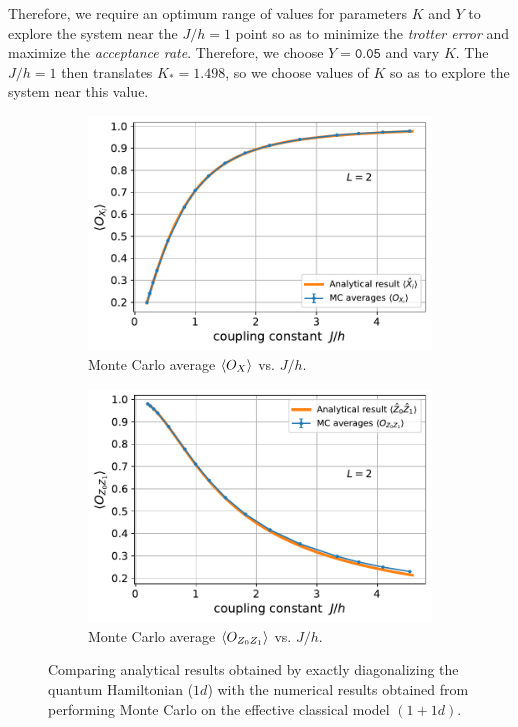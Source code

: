 \documentclass[../thesis_main.tex]{subfiles}
\begin{document}
Therefore, we require an optimum range of values for parameters $K$ and $Y$ to explore the system near the $J/h = 1$ point so as to minimize the \textit{trotter error} and maximize the \textit{acceptance rate}. Therefore, we choose $Y = \texttt{0.05}$ and vary $K$. The $J/h = 1$ then translates $K_* = 1.498$, so we choose values of $K$ so as to explore the system near this value.    
\begin{figure}[!htb]
    \centering
    \begin{subfigure}[b]{0.49\textwidth}
        \centering
        \includegraphics[width=\textwidth]{images/2_site/O_X.pdf}
        \caption{Monte Carlo average $\expval{O_X}$ vs. $J/h$.}
        \label{expval_O_X_vs_J/h_2}
    \end{subfigure}
    \begin{subfigure}[b]{0.49\textwidth}  %
        \centering
        \includegraphics[width=\textwidth]{images/2_site/O_Z0Z1.pdf}
        \caption{Monte Carlo average $\expval{O_{Z_0 Z_1}}$ vs. $J/h$.}
        \label{expval_O_ZZ_vs_J/h_2}
    \end{subfigure}
    \caption{Comparing analytical results obtained by exactly diagonalizing the quantum Hamiltonian ($1d$)  with the numerical results obtained from performing Monte Carlo on the effective classical model $(1+1d)$.}
    \label{expval_O_vs_J/h_2}
\end{figure}
\end{document}
